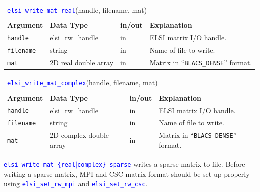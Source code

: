 \documentclass{report}
\newcommand{\api}[1]{\textcolor{blue}{\texttt{#1}}}
\begin{document}
\begin{tabular}[]{|p{20mm}|p{40mm}|p{10mm}|p{92mm}|}
\multicolumn{4}{l}{\api{elsi\_write\_mat\_real}(handle, filename, mat)}\\
\multicolumn{4}{l}{}\\
\hline
\multicolumn{1}{|l|}{\textbf{Argument}} & \multicolumn{1}{l|}{\textbf{Data Type}} & \multicolumn{1}{l|}{\textbf{in/out}} & \multicolumn{1}{l|}{\textbf{Explanation}}\\
\hline
\texttt{handle}   & elsi\_rw\_handle     & in & ELSI matrix I/O handle.\\
\hline
\texttt{filename} & string               & in & Name of file to write.\\
\hline
\texttt{mat}      & 2D real double array & in & Matrix in ``\texttt{BLACS\_DENSE}'' format.\\
\hline
\end{tabular}

\begin{tabular}[]{|p{20mm}|p{40mm}|p{10mm}|p{92mm}|}
\multicolumn{4}{l}{\api{elsi\_write\_mat\_complex}(handle, filename, mat)}\\
\multicolumn{4}{l}{}\\
\hline
\multicolumn{1}{|l|}{\textbf{Argument}} & \multicolumn{1}{l|}{\textbf{Data Type}} & \multicolumn{1}{l|}{\textbf{in/out}} & \multicolumn{1}{l|}{\textbf{Explanation}}\\
\hline
\texttt{handle}   & elsi\_rw\_handle        & in & ELSI matrix I/O handle.\\
\hline
\texttt{filename} & string                  & in & Name of file to write.\\
\hline
\texttt{mat}      & 2D complex double array & in & Matrix in ``\texttt{BLACS\_DENSE}'' format.\\
\hline
\end{tabular}

\api{elsi\_write\_mat\_\{real$\vert$complex\}\_sparse} writes a sparse matrix to file. Before writing a sparse matrix, MPI and CSC matrix format should be set up properly using \api{elsi\_set\_rw\_mpi} and \api{elsi\_set\_rw\_csc}.
\end{document}
